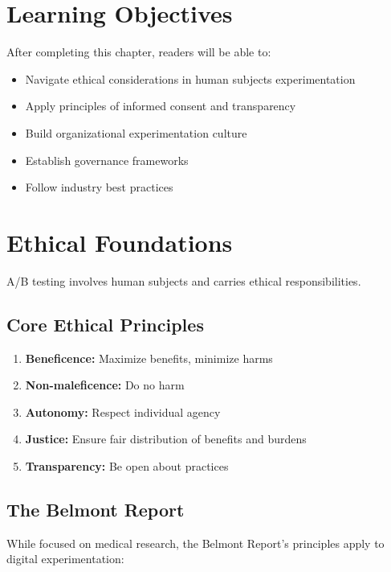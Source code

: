 \section{Learning Objectives}

After completing this chapter, readers will be able to:
\begin{itemize}
    \item Navigate ethical considerations in human subjects experimentation
    \item Apply principles of informed consent and transparency
    \item Build organizational experimentation culture
    \item Establish governance frameworks
    \item Follow industry best practices
\end{itemize}

\section{Ethical Foundations}

A/B testing involves human subjects and carries ethical responsibilities.

\subsection{Core Ethical Principles}

\begin{enumerate}
    \item \textbf{Beneficence:} Maximize benefits, minimize harms

    \item \textbf{Non-maleficence:} Do no harm

    \item \textbf{Autonomy:} Respect individual agency

    \item \textbf{Justice:} Ensure fair distribution of benefits and burdens

    \item \textbf{Transparency:} Be open about practices
\end{enumerate}

\subsection{The Belmont Report}

While focused on medical research, the Belmont Report's principles apply to digital experimentation:


